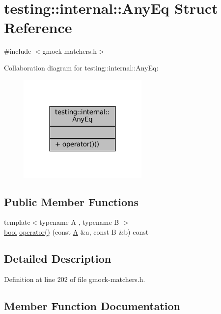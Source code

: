 \hypertarget{structtesting_1_1internal_1_1AnyEq}{}\section{testing\+:\+:internal\+:\+:Any\+Eq Struct Reference}
\label{structtesting_1_1internal_1_1AnyEq}


{\ttfamily \#include $<$gmock-\/matchers.\+h$>$}



Collaboration diagram for testing\+:\+:internal\+:\+:Any\+Eq\+:
\nopagebreak
\begin{figure}[H]
\begin{center}
\leavevmode
\includegraphics[width=180pt]{structtesting_1_1internal_1_1AnyEq__coll__graph}
\end{center}
\end{figure}
\subsection*{Public Member Functions}
\begin{DoxyCompactItemize}
\item 
{\footnotesize template$<$typename A , typename B $>$ }\\\hyperlink{classbool}{bool} \hyperlink{structtesting_1_1internal_1_1AnyEq_ad5dc8fa819c5fb541181bdc61fdccbe0}{operator()} (const \hyperlink{namespacetesting_a5e9134d655d2fc9323902348083282e7}{A} \&a, const B \&b) const
\end{DoxyCompactItemize}


\subsection{Detailed Description}


Definition at line 202 of file gmock-\/matchers.\+h.



\subsection{Member Function Documentation}
\mbox{\label{structtesting_1_1internal_1_1AnyEq_ad5dc8fa819c5fb541181bdc61fdccbe0}} 
